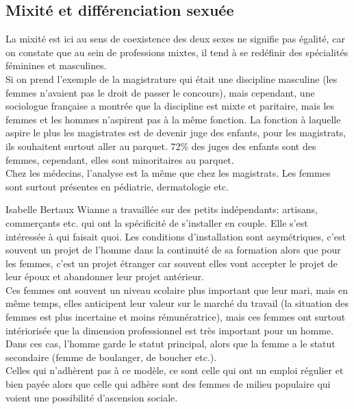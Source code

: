 \documentclass[12pt, a4paper, openany]{book}
\begin{document}
\subsection{Mixité et différenciation sexuée}

La mixité est ici au sens de coexistence des deux sexes ne signifie pas égalité, car on constate que au sein de professions mixtes, il tend à se redéfinir des spécialités féminines et masculines. \\
Si on prend l'exemple de la magistrature qui était une discipline masculine (les femmes n'avaient pas le droit de passer le concours), mais cependant, une sociologue française a montrée que la discipline est mixte et paritaire, mais les femmes et les hommes n'aspirent pas à la même fonction. La fonction à laquelle aspire le plus les magistrates est de devenir juge des enfants, pour les magistrats, ils souhaitent surtout aller au parquet. 72\% des juges des enfants sont des femmes, cependant, elles sont minoritaires au parquet. \\
Chez les médecins, l'analyse est la même que chez les magistrats. Les femmes sont surtout présentes en pédiatrie, dermatologie etc.


Isabelle Bertaux Wianne a travaillée sur des petits indépendants: artisans, commerçants etc. qui ont la spécificité de s'installer en couple. Elle s'est intéressée à qui faisait quoi. Les conditions d'installation sont asymétriques, c'est souvent un projet de l'homme dans la continuité de sa formation alors que pour les femmes, c'est un projet étranger car souvent elles vont accepter le projet de leur époux et abandonner leur projet antérieur. \\
Ces femmes ont souvent un niveau scolaire plus important que leur mari, mais en même temps, elles anticipent leur valeur sur le marché du travail (la situation des femmes est plus incertaine et moins rémunératrice), mais ces femmes ont surtout intériorisée que la dimension professionnel est très important pour un homme. Dans ces cas, l'homme garde le statut principal, alors que la femme a le statut secondaire (femme de boulanger, de boucher etc.). \\
Celles qui n'adhèrent pas à ce modèle, ce sont celle qui ont un emploi régulier et bien payée alors que celle qui adhère sont des femmes de milieu populaire qui voient une possibilité d'ascension sociale. 
\end{document}
